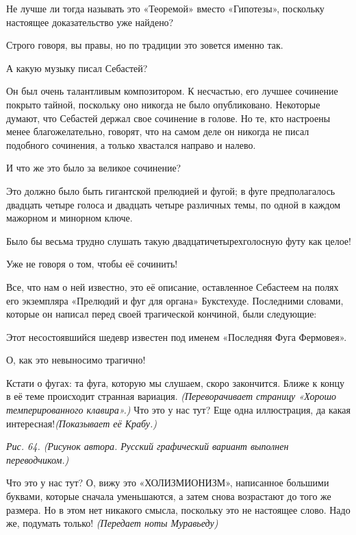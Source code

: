 \documentclass[../main.tex]{subfiles}
\begin{document}
\begin{dialogue}
 Не лучше ли тогда называть это «Теоремой» вместо «Гипотезы», поскольку настоящее доказательство уже найдено?

 Строго говоря, вы правы, но по традиции это зовется именно так.

 А какую музыку писал Себастей?

 Он был очень талантливым композитором. К несчастью, его лучшее сочинение покрыто тайной, поскольку оно никогда не было опубликовано. Некоторые думают, что Себастей держал свое сочинение в голове. Но те, кто настроены менее благожелательно, говорят, что на самом деле он никогда не писал подобного сочинения, а только хвастался направо и налево.

 И что же это было за великое сочинение?

 Это должно было быть гигантской прелюдией и фугой; в фуге предполагалось двадцать четыре голоса и двадцать четыре различных темы, по одной в каждом мажорном и минорном ключе.

 Было бы весьма трудно слушать такую двадцатичетырехголосную футу как целое!

 Уже не говоря о том, чтобы её сочинить!

 Все, что нам о ней известно, это её описание, оставленное Себастеем на полях его экземпляра «Прелюдий и фуг для органа» Букстехуде. Последними словами, которые он написал перед своей трагической кончиной, были следующие:


Этот несостоявшийся шедевр известен под именем «Последняя Фуга Фермовея».

 О, как это невыносимо трагично!

 Кстати о фугах: та фуга, которую мы слушаем, скоро закончится. Ближе к концу в её теме происходит странная вариация. \emph{(Переворачивает страницу «Хорошо темперированного клавира».)} Что это у нас тут? Еще одна иллюстрация, да какая интересная!\emph{(Показывает её Крабу.)}

\emph{Рис. 64. (Рисунок автора. Русский графический вариант выполнен переводчиком.)}

 Что это у нас тут? О, вижу это «ХОЛИЗМИОНИЗМ», написанное большими буквами, которые сначала уменьшаются, а затем снова возрастают до того же размера. Но в этом нет никакого смысла, поскольку это не настоящее слово. Надо же, подумать только! \emph{(Передает ноты Муравьеду)}


\end{dialogue}
\end{document}
